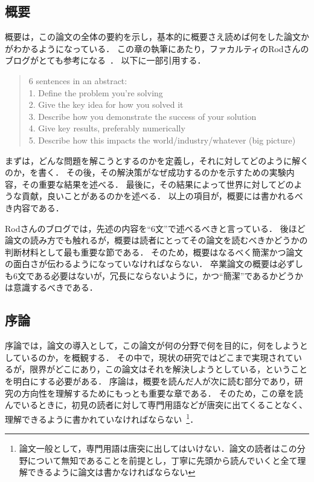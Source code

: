 \subsection{概要}
概要は，この論文の全体の要約を示し，基本的に概要さえ読めば何をした論文かがわかるようになっている．
この章の執筆にあたり，ファカルティのRodさんのブログがとても参考になる~\cite{rodblog}．
以下に一部引用する．
\begin{quote}
  6 sentences in an abstract:\\
  1. Define the problem you're solving\\
  2. Give the key idea for how you solved it\\
  3. Describe how you demonstrate the success of your solution\\
  4. Give key results, preferably numerically\\
  5. Describe how this impacts the world/industry/whatever (big picture)\\
\end{quote}
まずは，どんな問題を解こうとするのかを定義し，それに対してどのように解くのか，を書く．
その後，その解決策がなぜ成功するのかを示すための実験内容，その重要な結果を述べる．
最後に，その結果によって世界に対してどのような貢献，良いことがあるのかを述べる．
以上の項目が，概要には書かれるべき内容である．

Rodさんのブログでは，先述の内容を``6文''で述べるべきと言っている．
後ほど論文の読み方でも触れるが，概要は読者にとってその論文を読むべきかどうかの判断材料として最も重要な節である．
そのため，概要はなるべく簡潔かつ論文の面白さが伝わるようになっていなければならない．
卒業論文の概要は必ずしも6文である必要はないが，冗長にならないように，かつ``簡潔''であるかどうかは意識するべきである．

\subsection{序論}
序論では，論文の導入として，この論文が何の分野で何を目的に，何をしようとしているのか，を概観する．
その中で，現状の研究ではどこまで実現されているが，限界がどこにあり，この論文はそれを解決しようとしている，ということを明白にする必要がある．
序論は，概要を読んだ人が次に読む部分であり，研究の方向性を理解するためにもっとも重要な章である．
そのため，この章を読んでいるときに，初見の読者に対して専門用語などが唐突に出てくることなく、理解できるように書かれていなければならない~\footnote{論文一般として，専門用語は唐突に出してはいけない．論文の読者はこの分野について無知であることを前提とし，丁寧に先頭から読んでいくと全て理解できるように論文は書かなければならない}．

